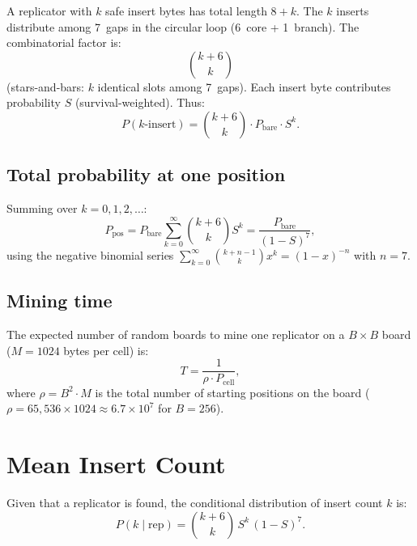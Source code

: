 \documentclass{article}
\begin{document}
A replicator with $k$ safe insert bytes has total length $8 + k$.
The $k$ inserts distribute among 7~gaps in the circular loop
(6~core + 1~branch).  The combinatorial factor is:
\begin{equation}
  \binom{k+6}{k}
  \label{eq:nplace}
\end{equation}
(stars-and-bars: $k$ identical slots among 7~gaps).
Each insert byte contributes probability $S$ (survival-weighted).
Thus:
\begin{equation}
P(k\text{-insert}) = \binom{k+6}{k} \cdot P_{\text{bare}} \cdot S^k.
\label{eq:pk}
\end{equation}

\subsection{Total probability at one position}

Summing over $k = 0, 1, 2, \ldots$:
\begin{equation}
P_{\text{pos}} = P_{\text{bare}} \sum_{k=0}^{\infty}
  \binom{k+6}{k} S^k
  = \frac{P_{\text{bare}}}{(1 - S)^7},
\label{eq:ppos}
\end{equation}
using the negative binomial series
$\sum_{k=0}^\infty \binom{k+n-1}{k} x^k = (1-x)^{-n}$ with $n = 7$.

\subsection{Mining time}

The expected number of random boards to mine one replicator on a
$B \times B$ board ($M = 1024$ bytes per cell) is:
\begin{equation}
\boxed{
T = \frac{1}{\rho \cdot P_{\text{cell}}},
}
\label{eq:T}
\end{equation}
where $\rho = B^2 \cdot M$ is the total number of starting positions
on the board ($\rho = 65{,}536 \times 1024 \approx 6.7 \times 10^7$
for $B = 256$).

\section{Mean Insert Count}
\label{sec:mean}

Given that a replicator is found, the conditional distribution of
insert count $k$ is:
\begin{equation}
P(k \mid \text{rep}) = \binom{k+6}{k}\,S^k\,(1-S)^7.
\label{eq:pk_cond}
\end{equation}
\end{document}

